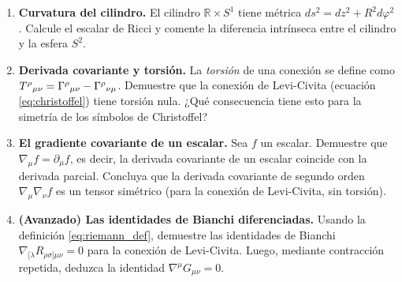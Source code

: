 \begin{enumerate}[leftmargin=2em, label=\textbf{P\thechapter.\arabic*.}]
  \item \textbf{Curvatura del cilindro.} El cilindro $\mathbb{R} \times S^1$ tiene métrica $ds^2 = dz^2 + R^2 d\varphi^2$. Calcule el escalar de Ricci y comente la diferencia intrínseca entre el cilindro y la esfera $S^2$.

  \item \textbf{Derivada covariante y torsión.} La \emph{torsión} de una conexión se define como $T^\rho{}_{\mu\nu} = \Gamma^{\rho}{}_{\mu \nu} - \Gamma^{\rho}{}_{\nu \mu}$. Demuestre que la conexión de Levi-Civita (ecuación \eqref{eq:christoffel}) tiene torsión nula. ¿Qué consecuencia tiene esto para la simetría de los símbolos de Christoffel?

  \item \textbf{El gradiente covariante de un escalar.} Sea $f$ un escalar. Demuestre que $\nabla_\mu f = \partial_\mu f$, es decir, la derivada covariante de un escalar coincide con la derivada parcial. Concluya que la derivada covariante de segundo orden $\nabla_\mu \nabla_\nu f$ es un tensor simétrico (para la conexión de Levi-Civita, sin torsión).

  \item \textbf{(Avanzado) Las identidades de Bianchi diferenciadas.} Usando la definición \eqref{eq:riemann_def}, demuestre las identidades de Bianchi $\nabla_{[\lambda}R_{\rho\sigma]\mu\nu}=0$ para la conexión de Levi-Civita. Luego, mediante contracción repetida, deduzca la identidad $\nabla^\mu G_{\mu\nu} = 0$.

\end{enumerate}
